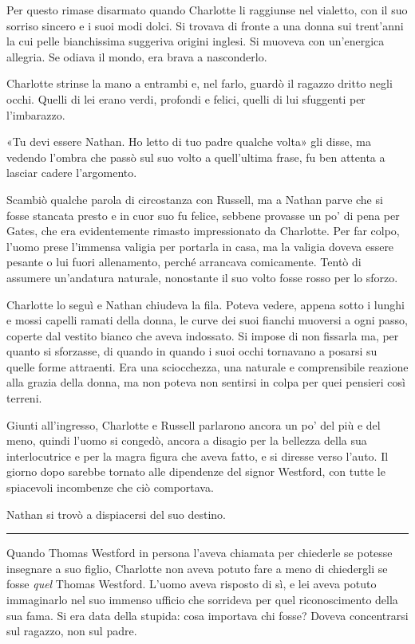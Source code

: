 \documentclass[a4paper,oneside,11pt]{memoir}
\begin{document}
Per questo rimase disarmato quando Charlotte li raggiunse nel vialetto, con il
suo sorriso sincero e i suoi modi dolci. Si trovava di fronte a una donna sui
trent'anni la cui pelle bianchissima suggeriva origini inglesi. Si muoveva con
un'energica allegria. Se odiava il mondo, era brava a nasconderlo.

Charlotte strinse la mano a entrambi e, nel farlo, guardò il ragazzo dritto
negli occhi. Quelli di lei erano verdi, profondi e felici, quelli di lui
sfuggenti per l'imbarazzo.

«Tu devi essere Nathan. Ho letto di tuo padre qualche volta» gli disse, ma
vedendo l'ombra che passò sul suo volto a quell'ultima frase, fu ben attenta a
lasciar cadere l'argomento.

Scambiò qualche parola di circostanza con Russell, ma a Nathan parve che si
fosse stancata presto e in cuor suo fu felice, sebbene provasse un po' di pena
per Gates, che era evidentemente rimasto impressionato da Charlotte. Per far
colpo, l'uomo prese l'immensa valigia per portarla in casa, ma la valigia doveva
essere pesante o lui fuori allenamento, perché arrancava comicamente. Tentò di
assumere un'andatura naturale, nonostante il suo volto fosse rosso per lo
sforzo.

Charlotte lo seguì e Nathan chiudeva la fila. Poteva vedere, appena sotto i
lunghi e mossi capelli ramati della donna, le curve dei suoi fianchi muoversi a
ogni passo, coperte dal vestito bianco che aveva indossato. Si impose di non
fissarla ma, per quanto si sforzasse, di quando in quando i suoi occhi tornavano
a posarsi su quelle forme attraenti. Era una sciocchezza, una naturale e
comprensibile reazione alla grazia della donna, ma non poteva non sentirsi in
colpa per quei pensieri così terreni.

Giunti all'ingresso, Charlotte e Russell parlarono ancora un po' del più e del
meno, quindi l'uomo si congedò, ancora a disagio per la bellezza della sua
interlocutrice e per la magra figura che aveva fatto, e si diresse verso l'auto.
Il giorno dopo sarebbe tornato alle dipendenze del signor Westford, con tutte le
spiacevoli incombenze che ciò comportava.

Nathan si trovò a dispiacersi del suo destino.

\plainbreak{1}

Quando Thomas Westford in persona l'aveva chiamata per chiederle se potesse
insegnare a suo figlio, Charlotte non aveva potuto fare a meno di chiedergli se
fosse \emph{quel} Thomas Westford. L'uomo aveva risposto di sì, e lei aveva
potuto immaginarlo nel suo immenso ufficio che sorrideva per quel riconoscimento
della sua fama. Si era data della stupida: cosa importava chi fosse? Doveva
concentrarsi sul ragazzo, non sul padre.
\end{document}
